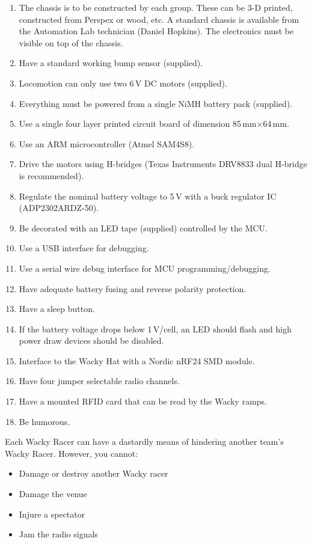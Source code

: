 \documentclass[11pt, a4paper]{article}
\begin{document}
\begin{enumerate}
\item The chassis is to be constructed by each group.  These can be
  3-D printed, constructed from Perspex or wood, etc.  A standard
  chassis is available from the Automation Lab technician (Daniel
  Hopkins).  The electronics must be visible on top of the chassis.
\item Have a standard working bump sensor (supplied).  
\item Locomotion can only use two 6\,V DC motors (supplied).
\item Everything must be powered from a single NiMH battery pack (supplied).
\item Use a single four layer printed circuit board of dimension 85\,mm$\times$64\,mm.
\item Use an ARM microcontroller (Atmel SAM4S8).
\item Drive the motors using H-bridges (Texas Instruments DRV8833 dual
  H-bridge is recommended).
\item Regulate the nominal battery voltage to 5\,V with a buck
  regulator IC (ADP2302ARDZ-50).
\item Be decorated with an LED tape (supplied) controlled by the MCU.
\item Use a USB interface for debugging.
\item Use a serial wire debug interface for MCU programming/debugging.
\item Have adequate battery fusing and reverse polarity protection.
\item Have a sleep button.
\item If the battery voltage drops below 1\,V/cell, an LED should flash and high power draw devices should be disabled.
\item Interface to the Wacky Hat with a Nordic nRF24 SMD module.
\item Have four jumper selectable radio channels.  
\item Have a mounted RFID card that can be read by the Wacky ramps.
\item Be humorous.    
\end{enumerate}


Each Wacky Racer can have a dastardly means of hindering another
team's Wacky Racer.  However, you cannot:
%
\begin{itemize}
\item Damage or destroy another Wacky racer
\item Damage the venue
\item Injure a spectator
\item Jam the radio signals  
\end{itemize}
\end{document}
